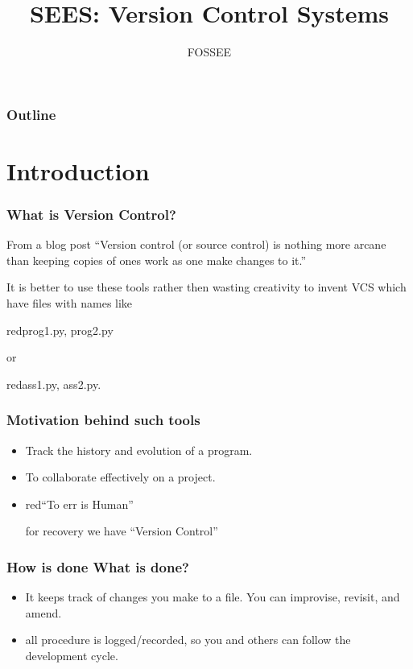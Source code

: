 \documentclass[14pt,compress]{beamer}
\title[Version Control Systems]{SEES: Version Control Systems}
\author[FOSSEE] {FOSSEE}
\institute[IIT Bombay] {Department of Aerospace Engineering\\IIT Bombay}
\date[]{}
\begin{document}
\begin{frame}
  \maketitle
\end{frame}

\begin{frame}
  \frametitle{Outline}
  \tableofcontents
\end{frame}

\section{Introduction}

\begin{frame}
  \frametitle{What is Version Control?}
  \begin{block}{From a blog post}
    ``Version control (or source control) is nothing more arcane than keeping copies of ones work as one make changes to it.''
  \end{block}
  \pause
  \begin{block}{}
    It is better to use these tools rather then wasting creativity to invent VCS which have files with names like \begin{color}{red}{prog1.py, prog2.py}\end{color} or \begin{color}{red}ass1.py, ass2.py.\end{color}
  \end{block}
\end{frame}

\begin{frame}
  \frametitle{Motivation behind such tools}
  \begin{itemize}
  \item Track the history and evolution of a program.
  \item To collaborate effectively on a project.
  \item \begin{color}{red}``To err is Human''\end{color} \pause for recovery we have ``Version Control''
  \end{itemize}
\end{frame}

\begin{frame}
  \frametitle{How is done What is done?}
  \begin{itemize}
  \item It keeps track of changes you make to a file. You can improvise, revisit, and amend.
  \item all procedure is logged/recorded, so you and others can follow the development cycle.
  \end{itemize}  
\end{frame}
\end{document}
